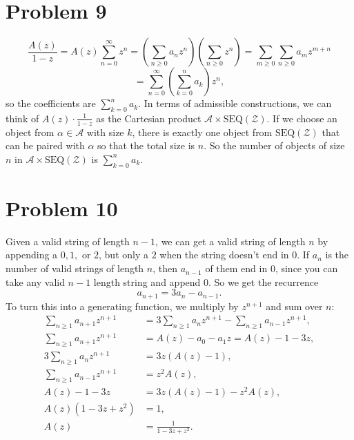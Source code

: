 \documentclass{article}
\newcommand{\mcA}{\mathcal{A}}
\newcommand{\mcZ}{\mathcal{Z}}
\newcommand{\bigp}[1]{\left(#1\right)}
\begin{document}
\section*{Problem 9}
$$\frac{A(z)}{1 - z} = A(z)\sum_{n = 0}^\infty z^n = \bigp{\sum_{n \ge 0} a_nz^n} \bigp{\sum_{n \ge 0} z^n} = \sum_{m \ge 0}\sum_{n \ge 0} a_m z^{m + n}$$
$$= \sum_{n = 0}^\infty \bigp{\sum_{k = 0}^n a_k}z^n,$$
so the coefficients are $\sum_{k = 0}^n a_k$. In terms of admissible constructions, we can think of $A(z) \cdot \frac{1}{1 - z}$ as the Cartesian product $\mcA \times \mathrm{SEQ}(\mcZ)$. If we choose an object from $\alpha \in \mcA$ with size $k$, there is exactly one object from $\mathrm{SEQ}(\mcZ)$ that can be paired with $\alpha$ so that the total size is $n$. So the number of objects of size $n$ in $\mcA \times \mathrm{SEQ}(\mcZ)$ is $\sum_{k = 0}^n a_k$.

\section*{Problem 10}
Given a valid string of length $n - 1$, we can get a valid string of length $n$ by appending a $0, 1,$ or $2$, but only a $2$ when the string doesn't end in $0$. If $a_n$ is the number of valid strings of length $n$, then $a_{n - 1}$ of them end in $0$, since you can take any valid $n - 1$ length string and append $0$. So we get the recurrence
$$a_{n + 1} = 3a_n - a_{n - 1}.$$
To turn this into a generating function, we multiply by $z^{n + 1}$ and sum over $n$:
\begin{align*}
\sum_{n \ge 1}a_{n + 1}z^{n + 1} &= 3\sum_{n \ge 1}a_nz^{n + 1} - \sum_{n \ge 1}a_{n - 1}z^{n + 1}, \\
\sum_{n \ge 1}a_{n + 1}z^{n + 1} &= A(z) - a_0 - a_1z = A(z) - 1 - 3z, \\
3\sum_{n \ge 1}a_nz^{n + 1} &= 3z(A(z) - 1), \\
\sum_{n \ge 1}a_{n - 1}z^{n + 1} &= z^2A(z), \\
A(z) - 1 - 3z &= 3z(A(z) - 1) - z^2A(z), \\
A(z)(1 - 3z + z^2) &= 1, \\
A(z) &= \frac{1}{1 - 3z + z^2}.
\end{align*}
\end{document}

